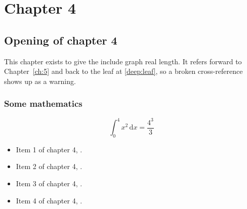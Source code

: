 \chapter{Chapter 4}
\label{ch:4}
\section{Opening of chapter 4}
This chapter exists to give the include graph real length. It refers
forward to Chapter~\ref{ch:5} and back to the leaf
at \ref{deep:leaf}, so a broken cross-reference shows up as a warning.

\subsection{Some mathematics}
\begin{equation}
  \int_0^{4} x^{2} \, \mathrm{d}x = \frac{4^{3}}{3}
\end{equation}

\begin{itemize}
  \item Item 1 of chapter 4, .
  \item Item 2 of chapter 4, .
  \item Item 3 of chapter 4, .
  \item Item 4 of chapter 4, .
\end{itemize}
